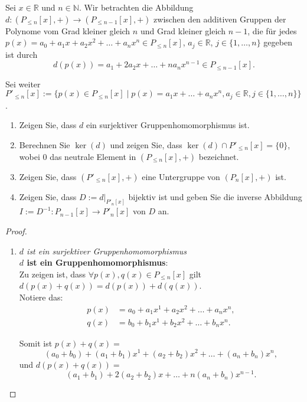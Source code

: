 \documentclass{../problemset}
\begin{document}
\begin{problem}
Sei $x \in \mathbb{R}$ und $n \in \mathbb{N}$.
Wir betrachten die Abbildung $d: (P_{\le n }[x], +) \to (P_{\le n-1}[x], +)$ zwischen den additiven Gruppen der Polynome vom Grad kleiner gleich $n$ und Grad kleiner gleich $n - 1$, die für jedes $p(x) = a_0 + a_1x + a_2x^2 + \ldots + a_nx^n \in P_{\le n}[x]$, $a_j \in \mathbb{R}$, $j \in \{1, \ldots, n\}$ gegeben ist durch \[
	d(p(x)) = a_1 + 2a_2x + \ldots + na_nx^{n-1} \in P_{\le n-1}[x].
\]

Sei weiter $P'_{\le n}[x] := \{p(x) \in P_{\le n}[x] \mid p(x) = a_1x + \ldots + a_nx^n, a_j \in \mathbb{R}, j \in \{1, \ldots, n\}\}$.

\begin{enumerate}
	\item Zeigen Sie, dass $d$ ein surjektiver Gruppenhomomorphismus ist.
	\item Berechnen Sie $\ker(d)$ und zeigen Sie, dass $\ker(d) \cap P'_{\le n}[x] = \{0\}$, wobei $0$ das neutrale Element in $(P_{\le n}[x], +)$ bezeichnet.
	\item Zeigen Sie, dass $(P'_{\le n}[x], +)$ eine Untergruppe von $(P_n[x], +)$ ist.
	\item Zeigen Sie, dass $D := d|_{P'_n[x]}$ bijektiv ist und geben Sie die inverse Abbildung $I := D^{-1}: P_{n-1}[x] \to P'_n[x]$ von $D$ an.
\end{enumerate}

\begin{proof}
	\begin{enumerate}
		\item \textit{$d$ ist ein surjektiver Gruppenhomomorphismus} \\
		      \textbf{$d$ ist ein Gruppenhomomorphismus}: \\
		      Zu zeigen ist, dass $\forall p(x),q(x) \in P_{\le n}[x]$ gilt $d(p(x) + q(x)) = d(p(x)) + d(q(x))$. \\

		      Notiere das:
		      \begin{align}
			      p(x) &= a_0 + a_1x^1 + a_2x^2 + \ldots + a_nx^n, \\
			      q(x) &= b_0 + b_1x^1 + b_2x^2 + \ldots + b_nx^n.
		      \end{align}

		      Somit ist $p(x) + q(x) =$ \[
			      (a_0+b_0) + (a_1+b_1)x^1 + (a_2 + b_2)x^2 + \ldots + (a_n+b_n)x^n,
		      \] und $d(p(x) + q(x)) =$ \[
			      (a_1+b_1) + 2(a_2 + b_2)x + \ldots + n(a_n+b_n)x^{n-1}.
		      \]


\end{enumerate}
\end{proof}
\end{problem}
\end{document}
